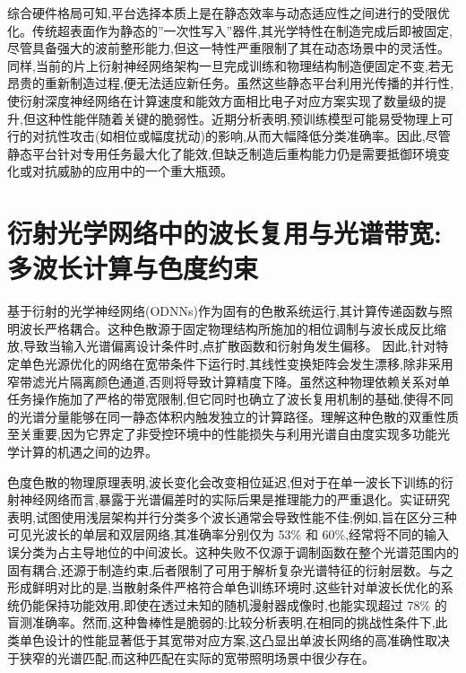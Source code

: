 \documentclass[11pt]{article}
\begin{document}
综合硬件格局可知,平台选择本质上是在静态效率与动态适应性之间进行的受限优化。传统超表面作为静态的''一次性写入''器件,其光学特性在制造完成后即被固定,尽管具备强大的波前整形能力,但这一特性严重限制了其在动态场景中的灵活性。同样,当前的片上衍射神经网络架构一旦完成训练和物理结构制造便固定不变,若无昂贵的重新制造过程,便无法适应新任务。虽然这些静态平台利用光传播的并行性,使衍射深度神经网络在计算速度和能效方面相比电子对应方案实现了数量级的提升,但这种性能伴随着关键的脆弱性。近期分析表明,预训练模型可能易受物理上可行的对抗性攻击(如相位或幅度扰动)的影响,从而大幅降低分类准确率。因此,尽管静态平台针对专用任务最大化了能效,但缺乏制造后重构能力仍是需要抵御环境变化或对抗威胁的应用中的一个重大瓶颈。\citep{doi_10_1002_nap2_70185_56c8ab30} \citep{doi_10_1117_12_3109287_f4650a31} \citep{doi_10_1109_dac18074_2021_9586204_0c48190f}

\section{衍射光学网络中的波长复用与光谱带宽:多波长计算与色度约束}\label{ux884dux5c04ux5149ux5b66ux7f51ux7edcux4e2dux7684ux6ce2ux957fux590dux7528ux4e0eux5149ux8c31ux5e26ux5bbdux591aux6ce2ux957fux8ba1ux7b97ux4e0eux8272ux5ea6ux7ea6ux675f}

基于衍射的光学神经网络(ODNNs)作为固有的色散系统运行,其计算传递函数与照明波长严格耦合。这种色散源于固定物理结构所施加的相位调制与波长成反比缩放,导致当输入光谱偏离设计条件时,点扩散函数和衍射角发生偏移。\citep{doi_10_1117_1_oe_65_5_058106_f60e3d89} 因此,针对特定单色光源优化的网络在宽带条件下运行时,其线性变换矩阵会发生漂移,除非采用窄带滤光片隔离颜色通道,否则将导致计算精度下降。虽然这种物理依赖关系对单任务操作施加了严格的带宽限制,但它同时也确立了波长复用机制的基础,使得不同的光谱分量能够在同一静态体积内触发独立的计算路径。理解这种色散的双重性质至关重要,因为它界定了非受控环境中的性能损失与利用光谱自由度实现多功能光学计算的机遇之间的边界。\citep{doi_10_1038_s41598_018_30619_y_5f5bfb09} \citep{doi_10_3390_nano14221812_4d7d91b1} \citep{doi_10_1109_icton67126_2025_11125227_383c0a4a}

色度色散的物理原理表明,波长变化会改变相位延迟,但对于在单一波长下训练的衍射神经网络而言,暴露于光谱偏差时的实际后果是推理能力的严重退化。实证研究表明,试图使用浅层架构并行分类多个波长通常会导致性能不佳;例如,旨在区分三种可见光波长的单层和双层网络,其准确率分别仅为 53\% 和 60\%,经常将不同的输入误分类为占主导地位的中间波长。这种失败不仅源于调制函数在整个光谱范围内的固有耦合,还源于制造约束,后者限制了可用于解析复杂光谱特征的衍射层数。与之形成鲜明对比的是,当散射条件严格符合单色训练环境时,这些针对单波长优化的系统仍能保持功能效用,即使在透过未知的随机漫射器成像时,也能实现超过 78\% 的盲测准确率。然而,这种鲁棒性是脆弱的;比较分析表明,在相同的挑战性条件下,此类单色设计的性能显著低于其宽带对应方案,这凸显出单波长网络的高准确性取决于狭窄的光谱匹配,而这种匹配在实际的宽带照明场景中很少存在。\citep{doi_10_1002_adpr_202300310_6647aa64} \citep{doi_10_1038_s41377_023_01116_3_aba67a18}
\end{document}
